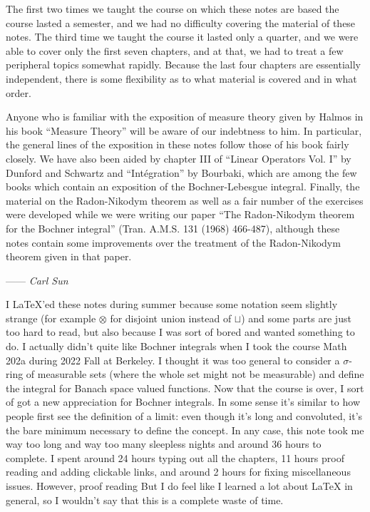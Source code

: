 The first two times we taught the course on which these notes are based the course lasted a semester, and we had no difficulty covering the material of these notes. The third time we taught the course it lasted only a quarter, and we were able to cover only the first seven chapters, and at that, we had to treat a few peripheral topics somewhat rapidly. Because the last four chapters are essentially independent, there is some flexibility as to what material is covered and in what order.

Anyone who is familiar with the exposition of measure theory given by Halmos in his book ``Measure Theory'' will be aware of our indebtness to him. In particular, the general lines of the exposition in these notes follow those of his book fairly closely. We have also been aided by chapter III of ``Linear Operators Vol. I'' by Dunford and Schwartz and ``Int\'{e}gration'' by Bourbaki, which are among the few books which contain an exposition of the Bochner-Lebesgue integral. Finally, the material on the Radon-Nikodym theorem as well as a fair number of the exercises were developed while we were writing our paper ``The Radon-Nikodym theorem for the Bochner integral'' (Tran. A.M.S. 131 (1968) 466-487), although these notes contain some improvements over the treatment of the Radon-Nikodym theorem given in that paper.



\hspace*{0pt}\hfill------ {\it Carl Sun}


I LaTeX'ed these notes during summer because some notation seem slightly strange (for example $\otimes$ for disjoint union instead of $\sqcup$) and some parts are just too hard to read, but also because I was sort of bored and wanted something to do. I actually didn't quite like Bochner integrals when I took the course Math 202a during 2022 Fall at Berkeley. I thought it was too general to consider a $\sigma$-ring of measurable sets (where the whole set might not be measurable) and define the integral for Banach space valued functions. Now that the course is over, I sort of got a new appreciation for Bochner integrals. In some sense it's similar to how people first see the definition of a limit: even though it's long and convoluted, it's the bare minimum necessary to define the concept. In any case, this note took me way too long and way too many sleepless nights and around 36 hours to complete. I spent around 24 hours typing out all the chapters, 11 hours proof reading and adding clickable links, and around 2 hours for fixing miscellaneous issues. However, proof reading But I do feel like I learned a lot about LaTeX in general, so I wouldn't say that this is a complete waste of time. 